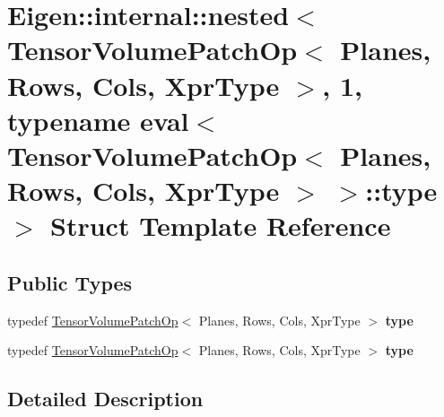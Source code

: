 \hypertarget{struct_eigen_1_1internal_1_1nested_3_01_tensor_volume_patch_op_3_01_planes_00_01_rows_00_01_cols82921df878abaf81e0e304ae8f39bd52}{}\section{Eigen\+:\+:internal\+:\+:nested$<$ Tensor\+Volume\+Patch\+Op$<$ Planes, Rows, Cols, Xpr\+Type $>$, 1, typename eval$<$ Tensor\+Volume\+Patch\+Op$<$ Planes, Rows, Cols, Xpr\+Type $>$ $>$\+:\+:type $>$ Struct Template Reference}
\label{struct_eigen_1_1internal_1_1nested_3_01_tensor_volume_patch_op_3_01_planes_00_01_rows_00_01_cols82921df878abaf81e0e304ae8f39bd52}
\subsection*{Public Types}
\begin{DoxyCompactItemize}
\item 
\mbox{\label{struct_eigen_1_1internal_1_1nested_3_01_tensor_volume_patch_op_3_01_planes_00_01_rows_00_01_cols82921df878abaf81e0e304ae8f39bd52_abb8200a13a264bd098b91f2d3dbc0598}} 
typedef \hyperlink{class_eigen_1_1_tensor_volume_patch_op}{Tensor\+Volume\+Patch\+Op}$<$ Planes, Rows, Cols, Xpr\+Type $>$ {\bfseries type}
\item 
\mbox{\label{struct_eigen_1_1internal_1_1nested_3_01_tensor_volume_patch_op_3_01_planes_00_01_rows_00_01_cols82921df878abaf81e0e304ae8f39bd52_abb8200a13a264bd098b91f2d3dbc0598}} 
typedef \hyperlink{class_eigen_1_1_tensor_volume_patch_op}{Tensor\+Volume\+Patch\+Op}$<$ Planes, Rows, Cols, Xpr\+Type $>$ {\bfseries type}
\end{DoxyCompactItemize}


\subsection{Detailed Description}
